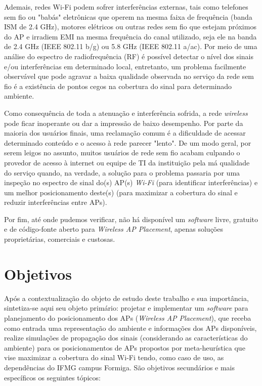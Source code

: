 \documentclass[
	12pt,				%
	openright,			%
	twoside,			%
	a4paper,			%
	english,			%
	french,				%
	spanish,			%
	brazil				%
	]{abntex2}
\begin{document}
Ademais, redes Wi-Fi podem sofrer interferências externas, tais como telefones sem fio ou "babás" eletrônicas que operem na mesma faixa de frequência (banda ISM de 2.4 GHz), motores elétricos ou outras redes sem fio que estejam próximos do AP e irradiem EMI na mesma frequência do canal utilizado, seja ele na banda de 2.4 GHz (IEEE 802.11 b/g) ou 5.8 GHz (IEEE 802.11 a/ac). Por meio de uma análise do espectro de radiofrequência (RF) é possível detectar o nível dos sinais e/ou interferências em determinado local, entretanto, um problema facilmente observável que pode agravar a baixa qualidade observada no serviço da rede sem fio é a existência de pontos cegos na cobertura do sinal para determinado ambiente. 

Como consequência de toda a atenuação e interferência sofrida, a rede \textit{wireless} pode ficar inoperante ou dar a impressão de baixo desempenho. Por parte da maioria dos usuários finais, uma reclamação comum é a dificuldade de acessar determinado conteúdo e o acesso à rede parecer "lento". De um modo geral, por serem leigos no assunto, muitos usuários de rede sem fio acabam culpando o provedor de acesso à internet ou equipe de TI da instituição  pela má qualidade do serviço quando, na verdade, a solução para o problema passaria por uma inspeção no espectro de sinal do(s) AP(s) \textit{Wi-Fi} (para identificar interferências) e um melhor posicionamento deste(s) (para maximizar a cobertura do sinal e reduzir interferências entre APs).

Por fim, até onde pudemos verificar, não há disponível um \textit{software} livre, gratuito e de código-fonte aberto para \textit{Wireless AP Placement}, apenas soluções proprietárias, comerciais e custosas. 


\section{Objetivos}

Após a contextualização do objeto de estudo deste trabalho e sua importância, sintetiza-se aqui seu objeto primário: projetar e implementar um \textit{software} para planejamento do posicionamento dos APs (\textit{Wireless AP Placement}), que receba como entrada uma representação do ambiente e informações dos APs disponíveis, realize simulações de propagação dos sinais (considerando as características do ambiente) para os posicionamentos de APs propostos por meta-heurística que vise maximizar a cobertura do sinal Wi-Fi tendo, como caso de uso, as dependências do IFMG campus Formiga. 
São objetivos secundários e mais específicos os seguintes tópicos:
\end{document}
